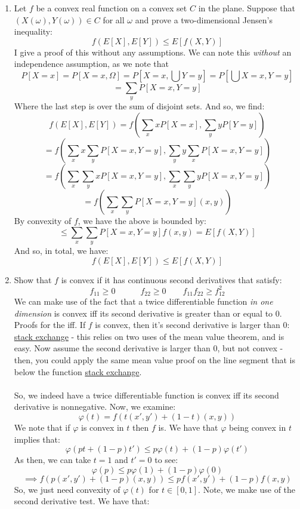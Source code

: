 \documentclass[12pt,a4paper]{article}
\newcommand{\1}[1]{\mathbbm{1}\left\{ #1 \right\}}
\begin{document}
\begin{enumerate}
	\item Let $f$ be a convex real function on a convex set $C$ in the plane. Suppose that $(X(\omega),Y(\omega)) \in C$ for all $\omega$ and prove a two-dimensional Jensen's inequality:
	$$
		f(E[X],E[Y]) \leq E[f(X,Y)]
	$$
	I give a proof of this without any assumptions. We can note this \textit{without} an independence assumption, as we note that
	$$
		P[X = x] = P[X = x, \Omega] = P[X = x, \bigcup Y = y] = P[\bigcup X = x, Y = y]
	$$
	$$
		= \sum_y P[X = x, Y = y]
	$$
	Where the last step is over the sum of disjoint sets. And so, we find:
	$$
		f(E[X],E[Y]) = f\left(\sum_x x P[X = x], \sum_y y P[Y = y]\right)
	$$
	$$
		= f\left(\sum_x x \sum_y P[X = x, Y = y], \sum_y y \sum_x P[X = x, Y = y]\right)
	$$
	$$
		= f\left(\sum_x \sum_y x P[X = x, Y = y], \sum_x \sum_y y P[X = x, Y = y]\right)
	$$
	$$
		= f\left(\sum_x \sum_y P[X = x, Y = y] (x,y)\right)
	$$
	By convexity of $f$, we have the above is bounded by:
	$$
		\leq \sum_x \sum_y P[X = x, Y = y] f(x,y) = E[f(X,Y)]
	$$
	And so, in total, we have:
	$$
		f(E[X],E[Y]) \leq E[f(X,Y)]
	$$
	\item Show that $f$ is convex if it has continuous second derivatives that satisfy:
	$$
		f_{11} \geq 0 \quad\quad\quad f_{22} \geq 0 \quad\quad
		f_{11}f_{22} \geq f_{12}^2
	$$
	We can make use of the fact that a twice differentiable function \textit{in one dimension} is convex iff its second derivative is greater than or equal to 0. Proofs for the iff. If $f$ is convex, then it's second derivative is larger than $0$: \href{https://math.stackexchange.com/a/1226418}{stack exchange} - this relies on two uses of the mean value theorem, and is easy. Now assume the second derivative is larger than $0$, but not convex - then, you could apply the same mean value proof on the line segment that is below the function \href{https://math.stackexchange.com/a/513913}{stack exchange}.
	\\\\
	So, we indeed have a twice differentiable function is convex iff its second derivative is nonnegative. Now, we examine:
	$$
		\varphi(t) = f(t(x',y') + (1-t)(x,y))
	$$
	We note that if $\varphi$ is convex in $t$ then $f$ is. We have that $\varphi$ being convex in $t$ implies that:
	$$
		\varphi(pt + (1-p)t') \leq p\varphi(t) + (1-p)\varphi(t')
	$$
	As then, we can take $t = 1$ and $t' = 0$ to see:
	$$
		\varphi(p) \leq p\varphi(1) + (1-p)\varphi(0)
	$$
	$$
		\implies
		f(p(x',y') + (1-p)(x,y)) \leq pf(x',y') + (1-p)f(x,y)
	$$
	So, we just need convexity of $\varphi(t)$ for $t \in [0,1]$. Note, we make use of the second derivative test. We have that:

\end{enumerate}
\end{document}
